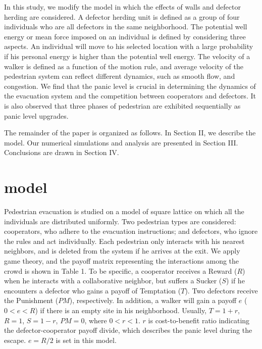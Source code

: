 \documentclass[%
 reprint,
 amsmath,amssymb,
 aps,
]{revtex4-1}
\begin{document}
In this study, we modify the model \cite{game7} in which the effects of walls and defector herding are considered. A defector herding unit is defined as a group of four individuals who are all defectors in the same neighborhood. The potential well energy or mean force imposed on an individual is defined by considering three aspects. An individual will move to his selected location with a large probability if his personal energy is higher than the potential well energy. The velocity of a walker is defined as a function of the motion rule, and average velocity of the pedestrian system can reflect different dynamics, such as smooth flow, and congestion. We find that the panic level is crucial in determining the dynamics of the evacuation system and the competition between cooperators and defectors. It is also observed that three phases of pedestrian are exhibited sequentially as panic level upgrades.

The remainder of the paper is organized as follows. In Section II, we describe the model. Our numerical simulations and analysis are presented in Section III. Conclusions are drawn in Section IV.

\section{\label{sec:level1}model}

Pedestrian evacuation is studied on a model of square lattice on which all the individuals are distributed uniformly. Two pedestrian types are considered: cooperators, who adhere to the evacuation instructions; and defectors, who ignore the rules and act individually. Each pedestrian only interacts with his nearest neighbors, and is deleted from the system if he arrives at the exit. We apply game theory, and the payoff matrix representing the interactions among the crowd is shown in Table 1. To be specific, a cooperator receives a Reward ($R$) when he interacts with a collaborative neighbor, but suffers a Sucker ($S$) if he encounters a defector who gains a payoff of Temptation ($T$). Two defectors receive the Punishment ($PM$), respectively. In addition, a walker will gain a payoff $e$ ($0<e<R$) if there is an empty site in his neighborhood. Usually, $T=1+r$, $R=1$, $S=1-r$, $PM=0$, where $0<r<1$. $r$ is cost-to-benefit ratio indicating the defector-cooperator payoff divide, which describes the panic level during the escape. $e=R/2$ is set in this model.
\end{document}
